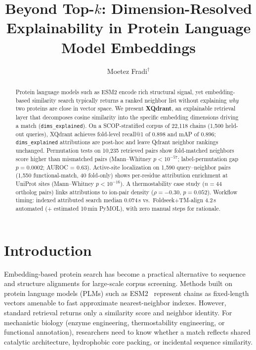 \documentclass{ws-procs11x85}
\begin{document}


\title{Beyond Top-$k$: Dimension-Resolved Explainability in Protein Language Model Embeddings}

\author{Moetez Fradi$^\dag$}

\address{University of Carthage, Tunisia\\
Tunis, Tunisia\\
$^\dag$E-mail: moetez.fradi@insat.ucar.tn}

\begin{abstract}
Protein language models such as ESM2 encode rich structural signal, yet embedding-based similarity search typically returns a ranked neighbor list without explaining \emph{why} two proteins are close in vector space. We present \textbf{XQdrant}, an explainable retrieval layer that decomposes cosine similarity into the specific embedding dimensions driving a match (\texttt{dims\_explained}). On a SCOP-stratified corpus of 22,118 chains (1,500 held-out queries), XQdrant achieves fold-level recall@1 of 0.898 and mAP of 0.896; \texttt{dims\_explained} attributions are post-hoc and leave Qdrant neighbor rankings unchanged. Permutation tests on 10,235 retrieved pairs show fold-matched neighbors score higher than mismatched pairs (Mann--Whitney $p < 10^{-57}$; label-permutation gap $p = 0.0002$; AUROC = 0.63). Active-site localization on 1,590 query--neighbor pairs (1,550 functional-match, 40 fold-only) shows per-residue attribution enrichment at UniProt sites (Mann--Whitney $p < 10^{-16}$). A thermostability case study ($n=44$ ortholog pairs) links attributions to ion-pair density ($\rho = -0.30$, $p = 0.052$). Workflow timing: indexed attributed search median 0.074\,s vs.\ Foldseek+TM-align 4.2\,s automated (+ estimated 10\,min PyMOL), with zero manual steps for rationale.
\end{abstract}



\section{Introduction}

Embedding-based protein search has become a practical alternative to sequence and structure alignments for large-scale corpus screening. Methods built on protein language models (PLMs) such as ESM2~\cite{rives2021esm2} represent chains as fixed-length vectors amenable to fast approximate nearest-neighbor indexes. However, standard retrieval returns only a similarity score and neighbor identity. For mechanistic biology (enzyme engineering, thermostability engineering, or functional annotation), researchers need to know whether a match reflects shared catalytic architecture, hydrophobic core packing, or incidental sequence similarity.
\end{document}
